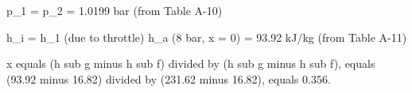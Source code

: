 p_1 = p_2 = 1.0199 bar (from Table A-10)  

h_i = h_1 (due to throttle)  
h_a (8 bar, x = 0) = 93.92 kJ/kg (from Table A-11)

x equals (h sub g minus h sub f) divided by (h sub g minus h sub f), equals (93.92 minus 16.82) divided by (231.62 minus 16.82), equals 0.356.